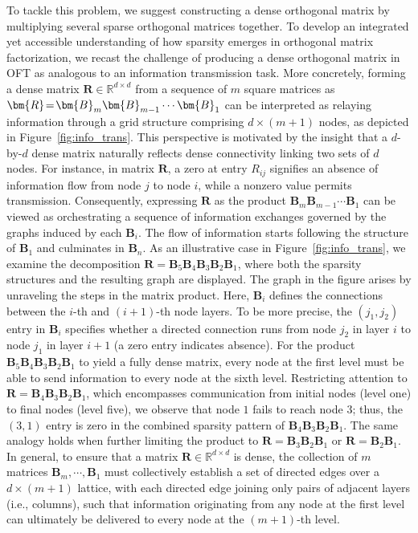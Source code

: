 To tackle this problem, we suggest constructing a dense orthogonal matrix by multiplying several sparse orthogonal matrices together. To develop an integrated yet accessible understanding of how sparsity emerges in orthogonal matrix factorization, we recast the challenge of producing a dense orthogonal matrix in OFT as analogous to an information transmission task. More concretely, forming a dense matrix $\bm{R}\in\mathbb{R}^{d\times d}$ from a sequence of $m$ square matrices as $\thickmuskip=2mu \medmuskip=2mu \bm{R}=\bm{B}_m\bm{B}_{m-1}\cdots\bm{B}_1$ can be interpreted as relaying information through a grid structure comprising $d\times (m+1)$ nodes, as depicted in Figure~\ref{fig:info_trans}. This perspective is motivated by the insight that a $d$-by-$d$ dense matrix naturally reflects dense connectivity linking two sets of $d$ nodes. For instance, in matrix $\bm{R}$, a zero at entry $R_{ij}$ signifies an absence of information flow from node $j$ to node $i$, while a nonzero value permits transmission. Consequently, expressing $\bm{R}$ as the product $\bm{B}_m\bm{B}_{m-1}\cdots\bm{B}_1$ can be viewed as orchestrating a sequence of information exchanges governed by the graphs induced by each $\bm{B}_i$. The flow of information starts following the structure of $\bm{B}_1$ and culminates in $\bm{B}_n$. As an illustrative case in Figure~\ref{fig:info_trans}, we examine the decomposition $\bm{R}=\bm{B}_5\bm{B}_4\bm{B}_3\bm{B}_2\bm{B}_1$, where both the sparsity structures and the resulting graph are displayed. The graph in the figure arises by unraveling the steps in the matrix product. Here, $\bm{B}_i$ defines the connections between the $i$-th and $(i+1)$-th node layers. To be more precise, the $(j_1,j_2)$ entry in $\bm{B}_i$ specifies whether a directed connection runs from node $j_2$ in layer $i$ to node $j_1$ in layer $i+1$ (a zero entry indicates absence). For the product $\bm{B}_5\bm{B}_4\bm{B}_3\bm{B}_2\bm{B}_1$ to yield a fully dense matrix, every node at the first level must be able to send information to every node at the sixth level. Restricting attention to $\bm{R}=\bm{B}_4\bm{B}_3\bm{B}_2\bm{B}_1$, which encompasses communication from initial nodes (level one) to final nodes (level five), we observe that node $1$ fails to reach node $3$; thus, the $(3,1)$ entry is zero in the combined sparsity pattern of $\bm{B}_4\bm{B}_3\bm{B}_2\bm{B}_1$. The same analogy holds when further limiting the product to $\bm{R}=\bm{B}_3\bm{B}_2\bm{B}_1$ or $\bm{R}=\bm{B}_2\bm{B}_1$. In general, to ensure that a matrix $\bm{R}\in\mathbb{R}^{d\times d}$ is dense, the collection of $m$ matrices $\bm{B}_m,\cdots,\bm{B}_1$ must collectively establish a set of directed edges over a $d\times (m+1)$ lattice, with each directed edge joining only pairs of adjacent layers (i.e., columns), such that information originating from any node at the first level can ultimately be delivered to every node at the $(m+1)$-th level.

